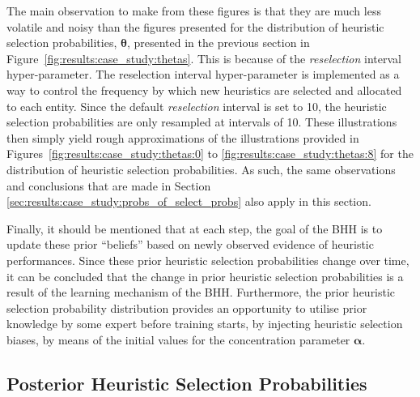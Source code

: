 The main observation to make from these figures is that they are much less volatile and noisy than the figures presented for the distribution of heuristic selection probabilities, $\boldsymbol{\theta}$, presented in the previous section in Figure~\ref{fig:results:case_study:thetas}. This is because of the \textit{reselection} interval hyper-parameter. The reselection interval hyper-parameter is implemented as a way to control the frequency by which new heuristics are selected and allocated to each entity. Since the default \textit{reselection} interval is set to 10, the heuristic selection probabilities are only resampled at intervals of 10. These illustrations then simply yield rough approximations of the illustrations provided in Figures~\ref{fig:results:case_study:thetas:0} to \ref{fig:results:case_study:thetas:8} for the distribution of heuristic selection probabilities. As such, the same observations and conclusions that are made in Section \ref{sec:results:case_study:probs_of_select_probs} also apply in this section.

Finally, it should be mentioned that at each step, the goal of the \acs{BHH} is to update these prior ``beliefs'' based on newly observed evidence of heuristic performances. Since these prior heuristic selection probabilities change over time, it can be concluded that the change in prior heuristic selection probabilities is a result of the learning mechanism of the \acs{BHH}. Furthermore, the prior heuristic selection probability distribution provides an opportunity to utilise prior knowledge by some expert before training starts, by injecting heuristic selection biases, by means of the initial values for the concentration parameter $\boldsymbol{\alpha}$.




\subsection{Posterior Heuristic Selection Probabilities}\label{sec:results:case_study:posterior_selec_prob}

